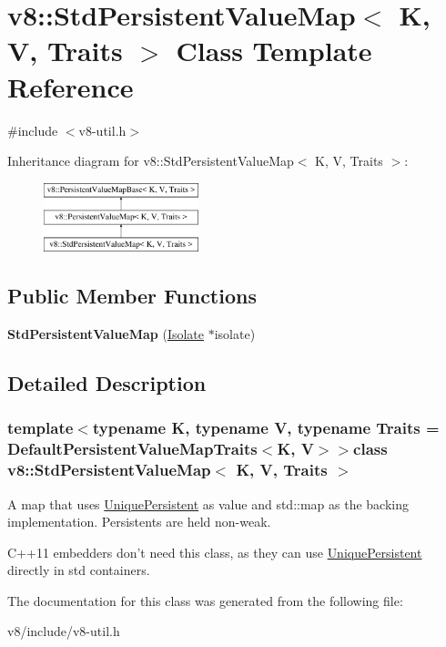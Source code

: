 \hypertarget{classv8_1_1StdPersistentValueMap}{\section{v8\-:\-:Std\-Persistent\-Value\-Map$<$ K, V, Traits $>$ Class Template Reference}
\label{classv8_1_1StdPersistentValueMap}
}


{\ttfamily \#include $<$v8-\/util.\-h$>$}

Inheritance diagram for v8\-:\-:Std\-Persistent\-Value\-Map$<$ K, V, Traits $>$\-:\begin{figure}[H]
\begin{center}
\leavevmode
\includegraphics[height=2.000000cm]{classv8_1_1StdPersistentValueMap}
\end{center}
\end{figure}
\subsection*{Public Member Functions}
\begin{DoxyCompactItemize}
\item 
\hypertarget{classv8_1_1StdPersistentValueMap_a44d7222a863267780db07c882056f73b}{{\bfseries Std\-Persistent\-Value\-Map} (\hyperlink{classv8_1_1Isolate}{Isolate} $\ast$isolate)}\label{classv8_1_1StdPersistentValueMap_a44d7222a863267780db07c882056f73b}

\end{DoxyCompactItemize}


\subsection{Detailed Description}
\subsubsection*{template$<$typename K, typename V, typename Traits = Default\-Persistent\-Value\-Map\-Traits$<$\-K, V$>$$>$class v8\-::\-Std\-Persistent\-Value\-Map$<$ K, V, Traits $>$}

A map that uses \hyperlink{classv8_1_1UniquePersistent}{Unique\-Persistent} as value and std\-::map as the backing implementation. Persistents are held non-\/weak.

C++11 embedders don't need this class, as they can use \hyperlink{classv8_1_1UniquePersistent}{Unique\-Persistent} directly in std containers. 

The documentation for this class was generated from the following file\-:\begin{DoxyCompactItemize}
\item 
v8/include/v8-\/util.\-h\end{DoxyCompactItemize}
